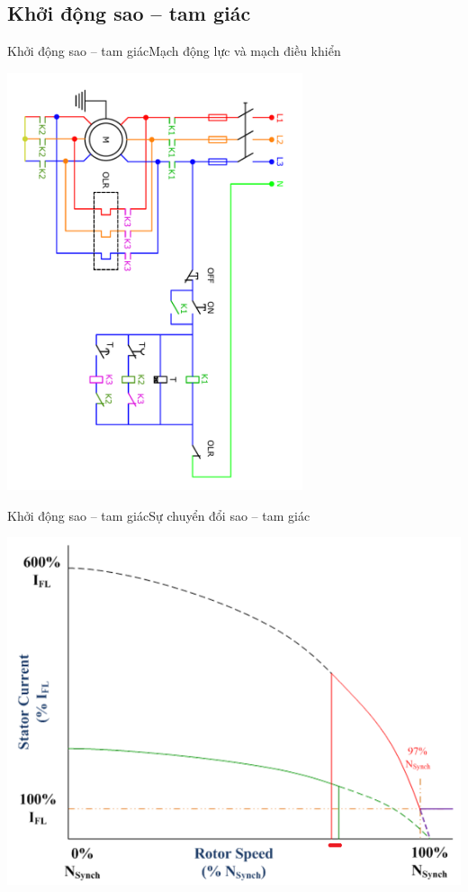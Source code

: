 \documentclass[17pt]{beamer}
\begin{document}
\subsection*{Khởi động sao -- tam giác}
\begin{frame}{Khởi động sao -- tam giác}{Mạch động lực và mạch điều khiển}
	\vspace{-.9cm}
	\begin{center}
		\includegraphics[width = 0.65\textwidth,angle=90]{../sodomach/sodomach-bc-chude1-2.pdf}
	\end{center}
\end{frame}

\begin{frame}{Khởi động sao -- tam giác}{Sự chuyển đổi sao -- tam giác}
	\vspace{-.5cm}
	\begin{center}
		\includegraphics[scale=.5]{images-chude1/chuyentiep-sao-tam-giac.png} 
	\end{center}
\end{frame}
\end{document}
